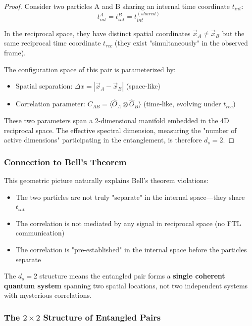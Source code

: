 \begin{proof}
Consider two particles A and B sharing an internal time coordinate $t_{int}$:
\begin{equation}
    t_{int}^A = t_{int}^B = t_{int}^{(shared)}
\end{equation}

In the reciprocal space, they have distinct spatial coordinates $\vec{x}_A \neq \vec{x}_B$ but the same reciprocal time coordinate $t_{rec}$ (they exist "simultaneously" in the observed frame).

The configuration space of this pair is parameterized by:
\begin{itemize}
    \item Spatial separation: $\Delta x = |\vec{x}_A - \vec{x}_B|$ (space-like)
    \item Correlation parameter: $C_{AB} = \langle \hat{O}_A \otimes \hat{O}_B \rangle$ (time-like, evolving under $t_{rec}$)
\end{itemize}

These two parameters span a 2-dimensional manifold embedded in the 4D reciprocal space. The effective spectral dimension, measuring the "number of active dimensions" participating in the entanglement, is therefore $d_s = 2$.
\end{proof}

\subsubsection{Connection to Bell's Theorem}

This geometric picture naturally explains Bell's theorem violations:
\begin{itemize}
    \item The two particles are not truly "separate" in the internal space—they share $t_{int}$
    \item The correlation is not mediated by any signal in reciprocal space (no FTL communication)
    \item The correlation is "pre-established" in the internal space before the particles separate
\end{itemize}

The $d_s = 2$ structure means the entangled pair forms a \textbf{single coherent quantum system} spanning two spatial locations, not two independent systems with mysterious correlations.

\subsubsection{The $2 \times 2$ Structure of Entangled Pairs}


